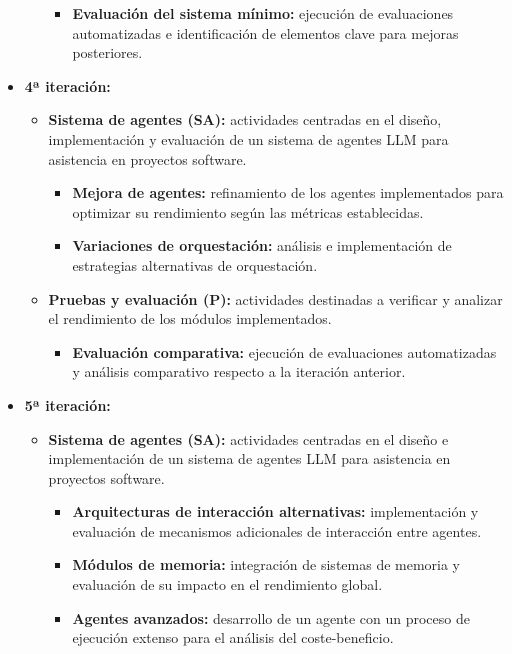 \begin{itemize}
\begin{itemize}
\begin{itemize}
          \item\textbf{Evaluación del sistema mínimo: } ejecución de evaluaciones automatizadas e identificación de elementos clave para mejoras posteriores.
        \end{itemize}
    \end{itemize}
  \item\textbf{4ª iteración:}
    \begin{itemize}
      \item\textbf{Sistema de agentes (SA):} actividades centradas en el diseño, implementación y evaluación de un sistema de agentes LLM para asistencia en proyectos software.
        \begin{itemize}
          \item\textbf{Mejora de agentes:} refinamiento de los agentes implementados para optimizar su rendimiento según las métricas establecidas.
          \item\textbf{Variaciones de orquestación:} análisis e implementación de estrategias alternativas de orquestación. 
        \end{itemize}
      \item\textbf{Pruebas y evaluación (P):} actividades destinadas a verificar y analizar el rendimiento de los módulos implementados.
        \begin{itemize}
          \item\textbf{Evaluación comparativa:} ejecución de evaluaciones automatizadas y análisis comparativo respecto a la iteración anterior.
        \end{itemize}
    \end{itemize}
  \item\textbf{5ª iteración:}
    \begin{itemize}
      \item\textbf{Sistema de agentes (SA):} actividades centradas en el diseño e implementación de un sistema de agentes LLM para asistencia en proyectos software.
        \begin{itemize}
          \item\textbf{Arquitecturas de interacción alternativas:} implementación y evaluación de mecanismos adicionales de interacción entre agentes.
          \item\textbf{Módulos de memoria:} integración de sistemas de memoria y evaluación de su impacto en el rendimiento global. 
          \item\textbf{Agentes avanzados:} desarrollo de un agente con un proceso de ejecución extenso para el análisis del coste-beneficio.

\end{itemize}
\end{itemize}
\end{itemize}
